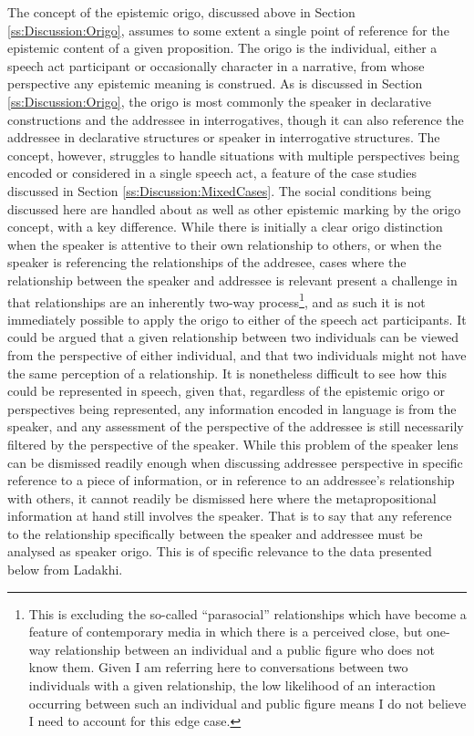 The concept of the epistemic origo, discussed above in Section \ref{ss:Discussion:Origo}, assumes to some extent a single point of reference for the epistemic content of a given proposition. The origo is the individual, either a speech act participant or occasionally character in a narrative, from whose perspective any epistemic meaning is construed. As is discussed in Section \ref{ss:Discussion:Origo}, the origo is most commonly the speaker in declarative constructions and the addressee in interrogatives, though it can also reference the addressee in declarative structures or speaker in interrogative structures. The concept, however, struggles to handle situations with multiple perspectives being encoded or considered in a single speech act, a feature of the case studies discussed in Section \ref{ss:Discussion:MixedCases}. The social conditions being discussed here are handled about as well as other epistemic marking by the origo concept, with a key difference. While there is initially a clear origo distinction when the speaker is attentive to their own relationship to others, or when the speaker is referencing the relationships of the addresee, cases where the relationship between the speaker and addressee is relevant present a challenge in that relationships are an inherently two-way process\footnote{This is excluding the so-called ``parasocial'' relationships which have become a feature of contemporary media in which there is a perceived close, but one-way relationship between an individual and a public figure who does not know them. Given I am referring here to conversations between two individuals with a given relationship, the low likelihood of an interaction occurring between such an individual and public figure means I do not believe I need to account for this edge case.}, and as such it is not immediately possible to apply the origo to either of the speech act participants. It could be argued that a given relationship between two individuals can be viewed from the perspective of either individual, and that two individuals might not have the same perception of a relationship. It is nonetheless difficult to see how this could be represented in speech, given that, regardless of the epistemic origo or perspectives being represented, any information encoded in language is from the speaker, and any assessment of the perspective of the addressee is still necessarily filtered by the perspective of the speaker. While this problem of the speaker lens can be dismissed readily enough when discussing addressee perspective in specific reference to a piece of information, or in reference to an addressee's relationship with others, it cannot readily be dismissed here where the metapropositional information at hand still involves the speaker. That is to say that any reference to the relationship specifically between the speaker and addressee must be analysed as speaker origo. This is of specific relevance to the data presented below from Ladakhi.

